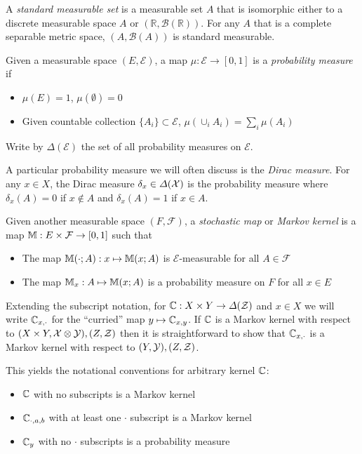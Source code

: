 A \emph{standard measurable set} is a measurable set $A$ that is isomorphic either to a discrete measurable space $A$ or $(\mathbb{R}, \mathcal{B}(\mathbb{R}))$. For any $A$ that is a complete separable metric space, $(A,\mathcal{B}(A))$ is standard measurable. 

Given a measurable space $(E,\mathcal{E})$, a map $\mu:\mathcal{E}\to [0,1]$ is a \emph{probability measure} if
\begin{itemize}
	\item $\mu(E)=1$, $\mu(\emptyset)=0$
	\item Given countable collection $\{A_i\}\subset\mathscr{E}$, $\mu(\cup_{i} A_i) = \sum_i \mu(A_i)$
\end{itemize}

Write by $\Delta(\mathcal{E})$ the set of all probability measures on $\mathcal{E}$.

A particular probability measure we will often discuss is the \emph{Dirac measure}. For any $x\in X$, the Dirac measure $\delta_x\in \Delta(\mathcal{X})$ is the probability measure where $\delta_x(A)=0$ if $x\not\in A$ and $\delta_x(A)=1$ if $x\in A$.

Given another measurable space $(F,\mathcal{F})$, a \emph{stochastic map} or \emph{Markov kernel} is a map $\mathbb{M}:E\times\mathcal{F}\to [0,1]$ such that
\begin{itemize}
	\item The map $\mathbb{M}(\cdot;A):x\mapsto \mathbb{M}(x;A)$ is $\mathcal{E}$-measurable for all $A\in \mathcal{F}$
	\item The map $\mathbb{M}_x:A\mapsto \mathbb{M}(x;A)$ is a probability measure on $F$ for all $x\in E$
\end{itemize}

Extending the subscript notation, for $\mathbb{C}:X\times Y\to \Delta(\mathcal{Z})$  and $x\in X$ we will write $\mathbb{C}_{x,\cdot}$ for the ``curried'' map $y\mapsto \mathbb{C}_{x,y}$. If $\mathbb{C}$ is a Markov kernel with respect to $(X\times Y, \mathcal{X}\otimes\mathcal{Y}),(Z,\mathcal{Z})$ then it is straightforward to show that $\mathbb{C}_{x,\cdot}$ is a Markov kernel with respect to $(Y,\mathcal{Y}),(Z,\mathcal{Z})$.

This yields the notational conventions for arbitrary kernel $\mathbb{C}$:

\begin{itemize}
	\item $\mathbb{C}$ with no subscripts is a Markov kernel
	\item $\mathbb{C}_{\cdot,a,b}$ with at least one $\cdot$ subscript is a Markov kernel
	\item $\mathbb{C}_y$ with no $\cdot$ subscripts is a probability measure
\end{itemize}

